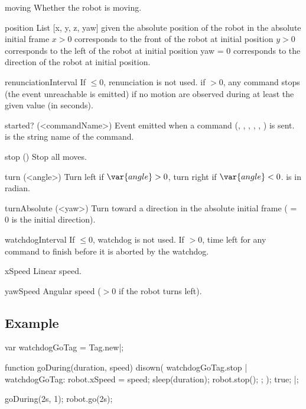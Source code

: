 \begin{urbiscriptapi}[jazz]
\item[moving] Whether the robot is moving.

\item[position] List [x, y, z, yaw] given the absolute position of the robot
  in the absolute initial frame $x > 0$ corresponds to the front of the
  robot at initial position $y > 0$ corresponds to the left of the robot at
  initial position yaw = 0 corresponds to the direction of the robot at
  initial position.

\item[renunciationInterval] If $\le 0$, renunciation is not used.  if $> 0$,
  any command stops (the event unreachable is emitted) if no motion are
  observed during at least the given value (in seconds).


\item[started?](<commandName>)%
  Event emitted when a command (, ,
  , , ,
  ) is sent.   is the
  string name of the command.

\item[stop]() Stop all moves.

\item[turn](<angle>) Turn left if $\var{angle} > 0$, turn right if
  $\var{angle} < 0$.  is in radian.

\item[turnAbsolute](<yaw>)%
  Turn toward a direction in the absolute initial frame ( = 0
  is the initial direction).

\item[watchdogInterval]%
  If $\le 0$, watchdog is not used.  If $> 0$, time left for any command to
  finish before it is aborted by the watchdog.

\item[xSpeed] Linear speed.

\item[yawSpeed] Angular speed ($> 0$ if the robot turns left).

\end{urbiscriptapi}


\subsection{Example}
\begin{urbiunchecked}
var watchdogGoTag = Tag.new|;

function goDuring(duration, speed)
{
  disown({
    watchdogGoTag.stop |
    watchdogGoTag:{
      robot.xSpeed = speed;
      sleep(duration);
      robot.stop();
    };
  });
  true;
}|;

goDuring(2s, 1);
robot.go(2s);
\end{urbiunchecked}



